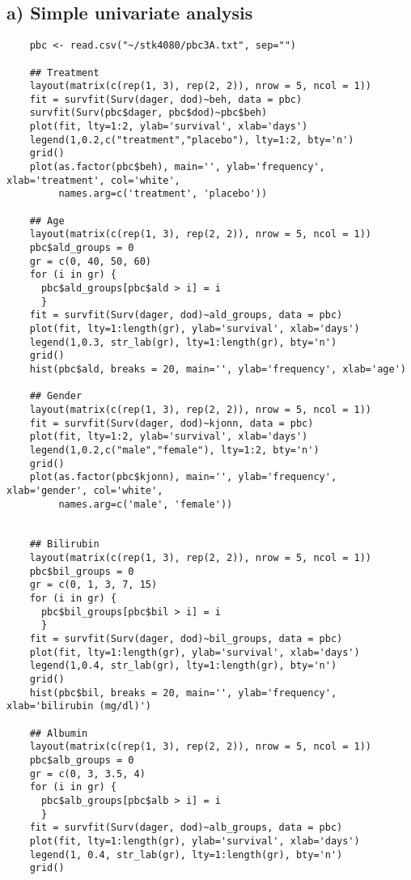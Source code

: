 \documentclass[11pt,a4paper]{article}
\begin{document}
\cleardoublepage{}
\begin{appendices}
    \section{a) Simple univariate analysis}
    \begin{verbatim}
    pbc <- read.csv("~/stk4080/pbc3A.txt", sep="")

    ## Treatment
    layout(matrix(c(rep(1, 3), rep(2, 2)), nrow = 5, ncol = 1))
    fit = survfit(Surv(dager, dod)~beh, data = pbc)
    survfit(Surv(pbc$dager, pbc$dod)~pbc$beh)
    plot(fit, lty=1:2, ylab='survival', xlab='days')
    legend(1,0.2,c("treatment","placebo"), lty=1:2, bty='n')
    grid()
    plot(as.factor(pbc$beh), main='', ylab='frequency', xlab='treatment', col='white',
         names.arg=c('treatment', 'placebo'))

    ## Age
    layout(matrix(c(rep(1, 3), rep(2, 2)), nrow = 5, ncol = 1))
    pbc$ald_groups = 0
    gr = c(0, 40, 50, 60)
    for (i in gr) {
      pbc$ald_groups[pbc$ald > i] = i
      }
    fit = survfit(Surv(dager, dod)~ald_groups, data = pbc)
    plot(fit, lty=1:length(gr), ylab='survival', xlab='days')
    legend(1,0.3, str_lab(gr), lty=1:length(gr), bty='n')
    grid()
    hist(pbc$ald, breaks = 20, main='', ylab='frequency', xlab='age')

    ## Gender
    layout(matrix(c(rep(1, 3), rep(2, 2)), nrow = 5, ncol = 1))
    fit = survfit(Surv(dager, dod)~kjonn, data = pbc)
    plot(fit, lty=1:2, ylab='survival', xlab='days')
    legend(1,0.2,c("male","female"), lty=1:2, bty='n')
    grid()
    plot(as.factor(pbc$kjonn), main='', ylab='frequency', xlab='gender', col='white',
         names.arg=c('male', 'female'))


    ## Bilirubin
    layout(matrix(c(rep(1, 3), rep(2, 2)), nrow = 5, ncol = 1))
    pbc$bil_groups = 0
    gr = c(0, 1, 3, 7, 15)
    for (i in gr) {
      pbc$bil_groups[pbc$bil > i] = i
      }
    fit = survfit(Surv(dager, dod)~bil_groups, data = pbc)
    plot(fit, lty=1:length(gr), ylab='survival', xlab='days')
    legend(1,0.4, str_lab(gr), lty=1:length(gr), bty='n')
    grid()
    hist(pbc$bil, breaks = 20, main='', ylab='frequency', xlab='bilirubin (mg/dl)')

    ## Albumin
    layout(matrix(c(rep(1, 3), rep(2, 2)), nrow = 5, ncol = 1))
    pbc$alb_groups = 0
    gr = c(0, 3, 3.5, 4)
    for (i in gr) {
      pbc$alb_groups[pbc$alb > i] = i
      }
    fit = survfit(Surv(dager, dod)~alb_groups, data = pbc)
    plot(fit, lty=1:length(gr), ylab='survival', xlab='days')
    legend(1, 0.4, str_lab(gr), lty=1:length(gr), bty='n')
    grid()


\end{verbatim}
\end{appendices}
\end{document}
